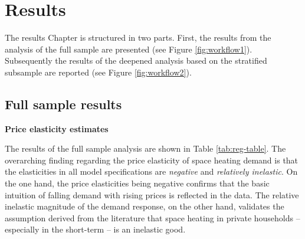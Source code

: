 \documentclass[12pt,twoside]{reedthesis}
\begin{document}
\hypertarget{results}{%
\chapter{Results}\label{results}}

The results Chapter is structured in two parts. First, the results from the analysis of the full sample are presented (see Figure \ref{fig:workflow1}). Subsequently the results of the deepened analysis based on the stratified subsample are reported (see Figure \ref{fig:workflow2}).

\hypertarget{full_sample_results}{%
\section{Full sample results}\label{full_sample_results}}

\textbf{Price elasticity estimates}

The results of the full sample analysis are shown in Table \ref{tab:reg-table}. The overarching finding regarding the price elasticity of space heating demand is that the elasticities in all model specifications are \emph{negative} and \emph{relatively inelastic}. On the one hand, the price elasticities being negative confirms that the basic intuition of falling demand with rising prices is reflected in the data. The relative inelastic magnitude of the demand response, on the other hand, validates the assumption derived from the literature that space heating in private households -- especially in the short-term -- is an inelastic good.
\end{document}
